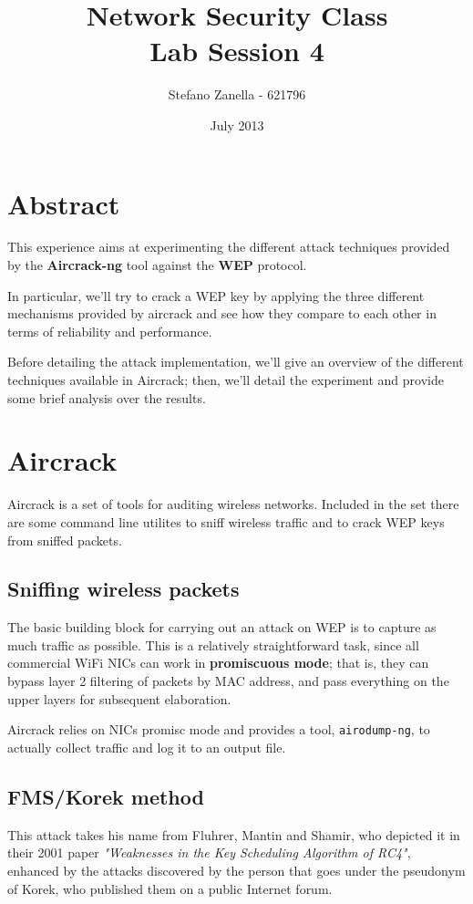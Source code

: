 \documentclass[a4paper,12pt,titlepage]{article}
\begin{document}
\title{Network Security Class \\ Lab Session 4}
\author{Stefano Zanella - 621796}
\date{July 2013}

\maketitle

\section{Abstract}
This experience aims at experimenting the different attack techniques provided
by the \textbf{Aircrack-ng} tool against the \textbf{WEP} protocol.

In particular, we'll try to crack a WEP key by applying the three different
mechanisms provided by aircrack and see how they compare to each other in terms
of reliability and performance.

Before detailing the attack implementation, we'll give an overview of the
different techniques available in Aircrack; then, we'll detail the experiment
and provide some brief analysis over the results.

\section{Aircrack}
Aircrack is a set of tools for auditing wireless networks. Included in the set
there are some command line utilites to sniff wireless traffic and to crack WEP
keys from sniffed packets.

\subsection*{Sniffing wireless packets}
The basic building block for carrying out an attack on WEP is to capture as
much traffic as possible. This is a relatively straightforward task, since
all commercial WiFi NICs can work in \textbf{promiscuous mode}; that is, they can
bypass layer 2 filtering of packets by MAC address, and pass everything on the
upper layers for subsequent elaboration.

Aircrack relies on NICs promisc mode and provides a tool, \texttt{airodump-ng}, to
actually collect traffic and log it to an output file.

\subsection*{FMS/Korek method}
This attack takes his name from Fluhrer, Mantin and Shamir, who depicted it in
their 2001 paper \emph{"Weaknesses in the Key Scheduling Algorithm of RC4"},
enhanced by the attacks discovered by the person that goes under the pseudonym
of Korek, who published them on a public Internet forum.
\end{document}
